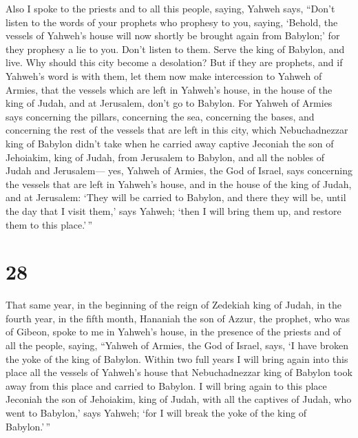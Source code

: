  Also I spoke to the priests and to all this people,
saying, Yahweh says, ``Don't listen to the words of your prophets who
prophesy to you, saying, `Behold, the vessels of Yahweh's house will now
shortly be brought again from Babylon;' for they prophesy a lie to you.
 Don't listen to them. Serve the king of Babylon, and
live. Why should this city become a desolation?  But if
they are prophets, and if Yahweh's word is with them, let them now make
intercession to Yahweh of Armies, that the vessels which are left in
Yahweh's house, in the house of the king of Judah, and at Jerusalem,
don't go to Babylon.  For Yahweh of Armies says
concerning the pillars, concerning the sea, concerning the bases, and
concerning the rest of the vessels that are left in this city,
 which Nebuchadnezzar king of Babylon didn't take when he
carried away captive Jeconiah the son of Jehoiakim, king of Judah, from
Jerusalem to Babylon, and all the nobles of Judah and Jerusalem---
 yes, Yahweh of Armies, the God of Israel, says
concerning the vessels that are left in Yahweh's house, and in the house
of the king of Judah, and at Jerusalem:  `They will be
carried to Babylon, and there they will be, until the day that I visit
them,' says Yahweh; `then I will bring them up, and restore them to this
place.'\,''

\hypertarget{section-27}{%
\section{28}\label{section-27}}

 That same year, in the beginning of the reign of Zedekiah
king of Judah, in the fourth year, in the fifth month, Hananiah the son
of Azzur, the prophet, who was of Gibeon, spoke to me in Yahweh's house,
in the presence of the priests and of all the people, saying,
 ``Yahweh of Armies, the God of Israel, says, `I have
broken the yoke of the king of Babylon.  Within two full
years I will bring again into this place all the vessels of Yahweh's
house that Nebuchadnezzar king of Babylon took away from this place and
carried to Babylon.  I will bring again to this place
Jeconiah the son of Jehoiakim, king of Judah, with all the captives of
Judah, who went to Babylon,' says Yahweh; `for I will break the yoke of
the king of Babylon.'\,''

